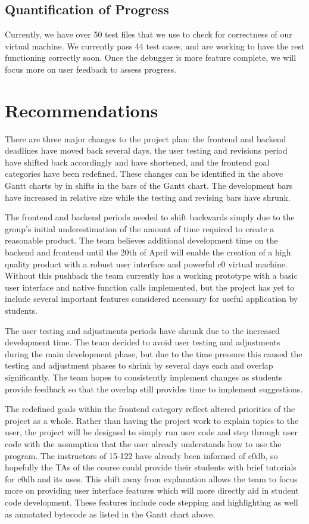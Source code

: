 \documentclass[11pt]{article}
\begin{document}
\subsection*{Quantification of Progress}
Currently, we have over 50 test files that we use to check for correctness of
our virtual machine. We currently pass 44 test cases, and are working to have
the rest functioning correctly soon. Once the debugger is more feature complete,
we will focus more on user feedback to assess progress.
\section{Recommendations}
There are three major changes to the project plan: the frontend and backend
deadlines have moved back several days, the user testing and revisions period
have shifted back accordingly and have shortened, and the frontend goal
categories have been redefined. These changes can be identified in the above
Gantt charts by in shifts in the bars of the Gantt chart. The development bars
have increased in relative size while the testing and revising bars have shrunk.
\par
The frontend and backend periods needed to shift backwards simply due to the
group’s initial underestimation of the amount of time required to create a
reasonable product. The team believes additional development time on the
backend and frontend until the 20th of April will enable the creation of a high
quality product with a robust user interface and powerful c0 virtual machine.
Without this pushback the team currently has a working prototype with a basic
user interface and native function calls implemented, but the project has yet
to include several important features considered necessary for useful
application by students.
\par
The user testing and adjustments periods have shrunk due to the increased
development time. The team decided to avoid user testing and adjustments during
the main development phase, but due to the time pressure this caused the
testing and adjustment phases to shrink by several days each and overlap
significantly. The team hopes to consistently implement changes as students
provide feedback so that the overlap still provides time to implement
suggestions.
\par
The redefined goals within the frontend category reflect altered priorities of
the project as a whole. Rather than having the project work to explain topics
to the user, the project will be designed to simply run user code and step
through user code with the assumption that the user already understands how to
use the program. The instructors of 15-122 have already been informed of c0db,
so hopefully the TAs of the course could provide their students with brief
tutorials for c0db and its uses. This shift away from explanation allows the
team to focus more on providing user interface features which will more
directly aid in student code development. These features include code stepping
and highlighting as well as annotated bytecode as listed in the Gantt chart
above.
\end{document}
